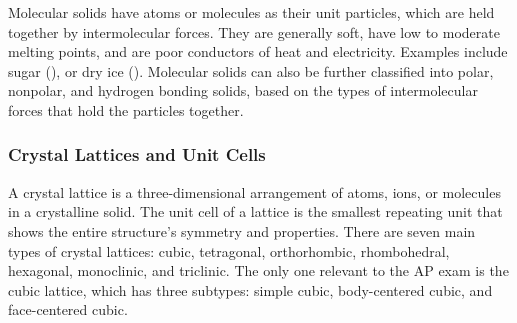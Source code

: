 Molecular solids have atoms or molecules as their unit particles, which are held together by intermolecular forces. They are generally soft, have low to moderate melting points, and are poor conductors of heat and electricity. Examples include sugar (), or dry ice (). Molecular solids can also be further classified into polar, nonpolar, and hydrogen bonding solids, based on the types of intermolecular forces that hold the particles together.
\subsubsection{Crystal Lattices and Unit Cells}
A crystal lattice is a three-dimensional arrangement of atoms, ions, or molecules in a crystalline solid. The unit cell of a lattice is the smallest repeating unit that shows the entire structure's symmetry and properties. There are seven main types of crystal lattices: cubic, tetragonal, orthorhombic, rhombohedral, hexagonal, monoclinic, and triclinic. The only one relevant to the AP exam is the cubic lattice, which has three subtypes: simple cubic, body-centered cubic, and face-centered cubic. 
